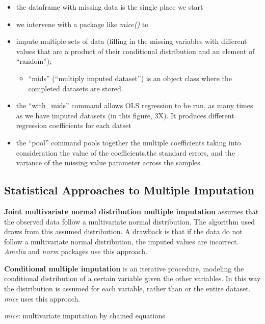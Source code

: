 \documentclass[
  11pt,
]{book}
\providecommand{\tightlist}{%
  \setlength{\itemsep}{0pt}\setlength{\parskip}{0pt}}
\begin{document}
\begin{itemize}
\tightlist
\item
  the dataframe with missing data is the single place we start
\item
  we intervene with a package like \emph{mice()} to
\item
  impute multiple sets of data (filling in the missing variables with different values that are a product of their conditional distribution and an element of ``random'');

  \begin{itemize}
  \tightlist
  \item
    ``mids'' (``multiply imputed dataset'') is an object class where the completed datasets are stored.
  \end{itemize}
\item
  the ``with\_mids'' command allows OLS regression to be run, as many times as we have imputed datasets (in this figure, 3X). It produces different regression coefficients for each datset
\item
  the ``pool'' command pools together the multiple coefficients taking into consideration the value of the coefficients,the standard errors, and the variance of the missing value parameter across the samples.
\end{itemize}

\hypertarget{statistical-approaches-to-multiple-imputation}{%
\subsection{Statistical Approaches to Multiple Imputation}\label{statistical-approaches-to-multiple-imputation}}

\textbf{Joint multivariate normal distribution multiple imputation} assumes that the observed data follow a multivariate normal distribution. The algorithm used draws from this assumed distribution. A drawback is that if the data do not follow a multivariate normal distribution, the imputed values are incorrect. \emph{Amelia} and \emph{norm} packages use this approach.

\textbf{Conditional multiple imputation} is an iterative procedure, modeling the conditional distribution of a certain variable given the other variables. In this way the distribution is assumed for each variable, rather than or the entire dataset. \emph{mice} uses this approach.

\emph{mice}: multivariate imputation by chained equations
\end{document}
